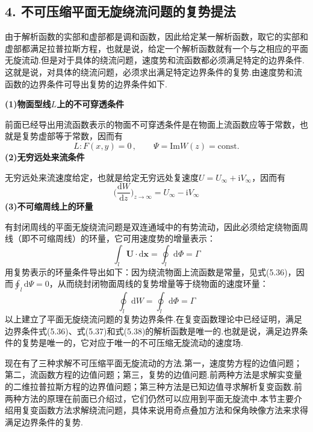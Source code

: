 \subsection*{4. 不可压缩平面无旋绕流问题的复势提法}

由于解析函数的实部和虚部都是调和函数，因此给定某一解析函数，取它的实部和虚部都满足拉普拉斯方程，也就是说，给定一个解析函数就有一个与之相应的平面无旋流动.但是对于具体的绕流问题，速度势和流函数都必须满足特定的边界条件.这就是说，对具体的绕流问题，必须求出满足特定边界条件的复势.由速度势和流函数的边界条件可导出复势的边界条件如下.

\textbf{(1)物面型线$L$上的不可穿透条件}

前面已经导出用流函数表示的物面不可穿透条件是在物面上流函数应等于常数，也就是复势虚部等于常数，因而有
\begin{equation*}
L:F(x,y)=0\,,\qquad \Psi=\mathrm{Im}W(z)=\mathrm{const.}
\tag{5.36}
\end{equation*}
\textbf{(2)无穷远处来流条件}

无穷远处来流速度给定，也就是给定无穷远处复速度$U=U_\infty+\mathrm{i}V_\infty$，因而有
\begin{equation*}
\Big(\frac{\mathrm{d}W}{\mathrm{d}z}\Big)_{z\to\infty}=U_\infty-\mathrm{i}V_\infty
\tag{5.37}
\end{equation*}
\textbf{(3)不可缩周线上的环量}

有封闭周线的平面无旋绕流问题是双连通域中的有势流动，因此必须给定绕物面周线（即不可缩周线）的环量，它可用速度势的增量表示：
\[
\int_l\boldsymbol{U}\cdot\mathrm{d}\boldsymbol{x}=\oint_l\mathrm{d}\Phi=\Gamma
\]
用复势表示的环量条件导出如下：因为绕流物面上流函数是常量，见式(5.36)，因而$\displaystyle\oint_l\mathrm{d}\Psi=0$，从而绕封闭物面周线的复势增量等于绕物面的速度环量：
\begin{equation*}
\oint_l\mathrm{d}W=\oint_l\mathrm{d}\Phi=\Gamma
\tag{5.38}
\end{equation*}
以上建立了平面无旋绕流问题的复势边界条件.在复变函数理论中已经证明，满足边界条件式(5.36)、式(5.37)和式(5.38)的解析函数是唯一的.也就是说，满足边界条件的复势是唯一的，它对应于唯一的不可压缩无旋流动的速度场.

现在有了三种求解不可压缩平面无旋流动的方法.第一，速度势方程的边值问题；第二，流函数方程的边值问题；第三，复势的边值问题.前两种方法是求解实变量的二维拉普拉斯方程的边界值问题；第三种方法是已知边值寻求解析复变函数.前两种方法的原理在前面已介绍过，它们仍然可以应用到平面无旋流中.本节主要介绍用复变函数方法求解绕流问题，具体来说用奇点叠加方法和保角映像方法来求得满足边界条件的复势.

